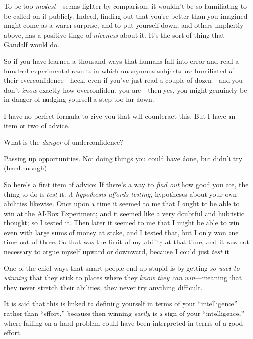 {
 To be too \textit{modest}{}---seems lighter by comparison; it
wouldn't be so humiliating to be called on it publicly.
Indeed, finding out that you're better than you
imagined might come as a warm surprise; and to put yourself down, and
others implicitly above, has a positive tinge of \textit{niceness}
about it. It's the sort of thing that Gandalf would
do.}

{
 So if you have learned a thousand ways that humans fall into error
and read a hundred experimental results in which anonymous subjects are
humiliated of their overconfidence---heck, even if
you've just read a couple of dozen---and you
don't \textit{know} exactly how overconfident you
are---then yes, you might genuinely be in danger of nudging yourself a
step too far down.}

{
 I have no perfect formula to give you that will counteract this.
But I have an item or two of advice.}

{
 What is the \textit{danger} of underconfidence?}

{
 Passing up opportunities. Not doing things you could have done,
but didn't try (hard enough).}

{
 So here's a first item of advice: If
there's a way to \textit{find out} how good you are,
the thing to do is \textit{test} it. \textit{A hypothesis affords
testing;} hypotheses about your own abilities likewise. Once upon a
time it seemed to me that I ought to be able to win at the AI-Box
Experiment; and it seemed like a very doubtful and hubristic thought;
so I tested it. Then later it seemed to me that I might be able to win
even with large sums of money at stake, and I tested that, but I only
won one time out of three. So that was the limit of my ability at that
time, and it was not necessary to argue myself upward or downward,
because I could just \textit{test} it.}

{
 One of the chief ways that smart people end up stupid is by
getting \textit{so used to winning} that they stick to places where
they \textit{know they can win}{}---meaning that they never stretch
their abilities, they never try anything difficult.}

{
 It is said that this is linked to defining yourself in terms of
your ``intelligence'' rather than
``effort,'' because then winning
\textit{easily} is a sign of your
``intelligence,'' where failing on a
hard problem could have been interpreted in terms of a good effort.}

